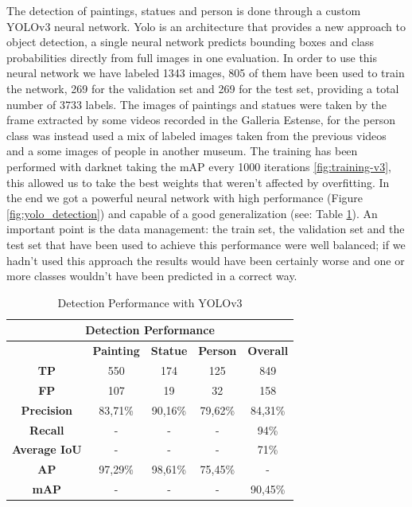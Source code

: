 The detection of paintings, statues and person is done through a custom YOLOv3 neural network\cite{yolov3}.
Yolo is an architecture that provides a new approach to object detection, a single neural network predicts bounding boxes and class probabilities directly from full images in one evaluation.
In order to use this neural network we have labeled 1343 images, 805 of them have been used to train the network, 269 for the validation set and 269 for the test set, providing a total number of 3733 labels. The images of paintings and statues were taken by the frame extracted by some videos recorded in the Galleria Estense, for the person class was instead used a mix of labeled images taken from the previous videos and a some images of people in another museum.
The training has been performed with darknet \cite{darknet} taking the mAP every 1000 iterations \ref{fig:training-v3}, this allowed us to take the best weights that weren't affected by overfitting.
In the end we got a powerful neural network with high performance (Figure \ref{fig:yolo_detection}) and capable of a good generalization (see: Table \ref{tab:detection_performance}).
An important point is the data management: the train set, the validation set and the test set that have been used to achieve this performance were well balanced; 
if we hadn't used this approach the results would have been certainly worse and one or more classes wouldn't have been predicted in a correct way.



\begin{table}[ht]
    \centering
\begin{tabular}{|c|c|c|c|c|}
\hline
\multicolumn{5}{|c|}{\textbf{Detection Performance}}       \\ \hline
\multicolumn{1}{|l|}{} & \textbf{Painting} & \textbf{Statue} & \textbf{Person} & \textbf{Overall} \\ \hline
\textbf{TP}        & 550     & 174     & 125     & 849     \\ \hline
\textbf{FP}        & 107     & 19      & 32      & 158     \\ \hline
\textbf{Precision} & 83,71\% & 90,16\% & 79,62\% & 84,31\% \\ \hline
\textbf{Recall}    & -       & -       & -       & 94\%    \\ \hline
\textbf{Average IoU}       & -       & -       & -       & 71\%    \\ \hline
\textbf{AP}        & 97,29\% & 98,61\% & 75,45\% & -       \\ \hline
\textbf{mAP}       & -       & -       & -       & 90,45\% \\ \hline
\end{tabular}
\caption{Detection Performance with YOLOv3} 
    \label{tab:detection_performance}
\end{table}



